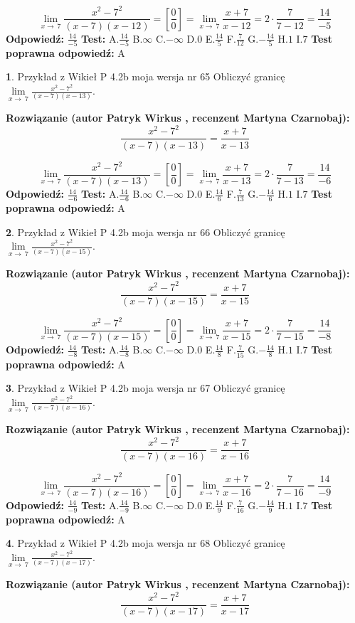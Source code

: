 \documentclass[12pt, a4paper]{article}
\theoremstyle{definition} %
\newtheorem{zad}{}
\newcommand{\zadStart}[1]{\begin{zad}#1\newline}
\newcommand{\zadStop}{\end{zad}}
\newcommand{\rozwStart}[2]{\noindent \textbf{Rozwiązanie (autor #1 , recenzent #2): }\newline}
\newcommand{\rozwStop}{\newline}
\newcommand{\odpStart}{\noindent \textbf{Odpowiedź:}\newline}
\newcommand{\odpStop}{\newline}
\newcommand{\testStart}{\noindent \textbf{Test:}\newline}
\newcommand{\testStop}{\newline}
\newcommand{\kluczStart}{\noindent \textbf{Test poprawna odpowiedź:}\newline}
\newcommand{\kluczStop}{\newline}
\begin{document}
$$\lim\limits_{x\to\ 7}\frac{x^{2}-7^{2}}{(x-7)(x-12)}=[\frac{0}{0}]=\lim\limits_{x\to\ 7}\frac{x+7}{x-12}=2 \cdot \frac{7}{7-12} = \frac{14}{-5}$$
\rozwStop
\odpStart
$\frac{14}{-5}$
\odpStop
\testStart
A.$\frac{14}{-5}$
B.$\infty$
C.$-\infty$
D.$0$
E.$\frac{14}{5}$
F.$\frac{7}{12}$
G.$-\frac{14}{5}$
H.$1$
I.$7$
\testStop
\kluczStart
A
\kluczStop



\zadStart{Przykład z Wikieł P 4.2b moja wersja nr 65}
Obliczyć granicę $\lim\limits_{x\to\ 7}\frac{x^{2}-7^{2}}{(x-7)(x-13)}$.
\zadStop
\rozwStart{Patryk Wirkus}{Martyna Czarnobaj}
$$\frac{x^{2}-7^{2}}{(x-7)(x-13)}=\frac{x+7}{x-13}$$

$$\lim\limits_{x\to\ 7}\frac{x^{2}-7^{2}}{(x-7)(x-13)}=[\frac{0}{0}]=\lim\limits_{x\to\ 7}\frac{x+7}{x-13}=2 \cdot \frac{7}{7-13} = \frac{14}{-6}$$
\rozwStop
\odpStart
$\frac{14}{-6}$
\odpStop
\testStart
A.$\frac{14}{-6}$
B.$\infty$
C.$-\infty$
D.$0$
E.$\frac{14}{6}$
F.$\frac{7}{13}$
G.$-\frac{14}{6}$
H.$1$
I.$7$
\testStop
\kluczStart
A
\kluczStop



\zadStart{Przykład z Wikieł P 4.2b moja wersja nr 66}
Obliczyć granicę $\lim\limits_{x\to\ 7}\frac{x^{2}-7^{2}}{(x-7)(x-15)}$.
\zadStop
\rozwStart{Patryk Wirkus}{Martyna Czarnobaj}
$$\frac{x^{2}-7^{2}}{(x-7)(x-15)}=\frac{x+7}{x-15}$$

$$\lim\limits_{x\to\ 7}\frac{x^{2}-7^{2}}{(x-7)(x-15)}=[\frac{0}{0}]=\lim\limits_{x\to\ 7}\frac{x+7}{x-15}=2 \cdot \frac{7}{7-15} = \frac{14}{-8}$$
\rozwStop
\odpStart
$\frac{14}{-8}$
\odpStop
\testStart
A.$\frac{14}{-8}$
B.$\infty$
C.$-\infty$
D.$0$
E.$\frac{14}{8}$
F.$\frac{7}{15}$
G.$-\frac{14}{8}$
H.$1$
I.$7$
\testStop
\kluczStart
A
\kluczStop



\zadStart{Przykład z Wikieł P 4.2b moja wersja nr 67}
Obliczyć granicę $\lim\limits_{x\to\ 7}\frac{x^{2}-7^{2}}{(x-7)(x-16)}$.
\zadStop
\rozwStart{Patryk Wirkus}{Martyna Czarnobaj}
$$\frac{x^{2}-7^{2}}{(x-7)(x-16)}=\frac{x+7}{x-16}$$

$$\lim\limits_{x\to\ 7}\frac{x^{2}-7^{2}}{(x-7)(x-16)}=[\frac{0}{0}]=\lim\limits_{x\to\ 7}\frac{x+7}{x-16}=2 \cdot \frac{7}{7-16} = \frac{14}{-9}$$
\rozwStop
\odpStart
$\frac{14}{-9}$
\odpStop
\testStart
A.$\frac{14}{-9}$
B.$\infty$
C.$-\infty$
D.$0$
E.$\frac{14}{9}$
F.$\frac{7}{16}$
G.$-\frac{14}{9}$
H.$1$
I.$7$
\testStop
\kluczStart
A
\kluczStop



\zadStart{Przykład z Wikieł P 4.2b moja wersja nr 68}
Obliczyć granicę $\lim\limits_{x\to\ 7}\frac{x^{2}-7^{2}}{(x-7)(x-17)}$.
\zadStop
\rozwStart{Patryk Wirkus}{Martyna Czarnobaj}
$$\frac{x^{2}-7^{2}}{(x-7)(x-17)}=\frac{x+7}{x-17}$$
\end{document}
